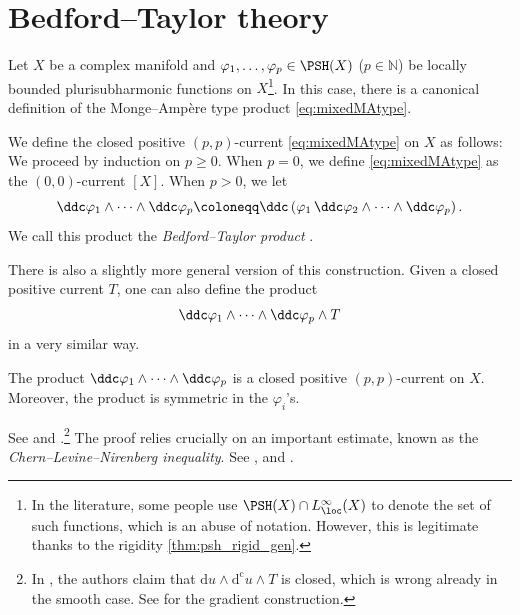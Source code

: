 \section{Bedford--Taylor theory}\label{sec:BTtheory}
Let $X$ be a complex manifold and $\varphi_1,\ldots,\varphi_p\in \PSH(X)$ ($p\in \mathbb{N}$) be locally bounded plurisubharmonic functions on $X$\footnote{In the literature, some people use $\PSH(X)\cap L^{\infty}_{\loc}(X)$ to denote the set of such functions, which is an abuse of notation. However, this is legitimate thanks to the rigidity \cref{thm:psh_rigid_gen}.}. In this case, there is a canonical definition of the Monge--Amp\`ere type product \eqref{eq:mixedMAtype}.
\begin{definition}\label{def:npp:L22}
    We define the closed positive $(p,p)$-current \eqref{eq:mixedMAtype} on $X$ as follows: We proceed by induction on $p\geq 0$. When $p=0$, we define \eqref{eq:mixedMAtype} as the $(0,0)$-current $[X]$. When $p>0$, we let
    \[
    \ddc \varphi_1\wedge \cdots \wedge \ddc\varphi_p\coloneqq \ddc \left( \varphi_1\,\ddc \varphi_2 \wedge \cdots \wedge \ddc\varphi_p \right).
    \]
    We call this product the \emph{Bedford--Taylor product} .
\end{definition}

\begin{remark}\label{rmk:extensionBT}
There is also a slightly more general version of this construction. Given a closed positive current $T$, one can also define the product
\[
\ddc \varphi_1\wedge \cdots \wedge \ddc\varphi_p \wedge T
\]
in a very similar way.
\end{remark}


\begin{proposition}\label{prop:npp:L40}
    The product $\ddc \varphi_1\wedge \cdots \wedge \ddc\varphi_p$ is a closed positive $(p,p)$-current on $X$. Moreover, the product is symmetric in the $\varphi_i$'s.
\end{proposition}
See \cite[Proposition~3.3, Corollary~3.12]{GZ17} and \cite[Theorem~9.2.5]{FPT}.\footnote{In \cite[Proposition~3.3]{GZ17}, the authors claim that $\mathrm{d}u\wedge \mathrm{d}^{\mathrm{c}}u\wedge T$ is closed, which is wrong already in the smooth case. See \cite[Lemma~9.13.1 and Section~B.15]{FPT} for the gradient construction.} The proof relies crucially on an important estimate, known as the \emph{Chern--Levine--Nirenberg inequality}. See \cite{CLN69}, \cite[Theorem~3.9]{GZ17} and \cite[Theorem~9.1.3]{FPT}.

